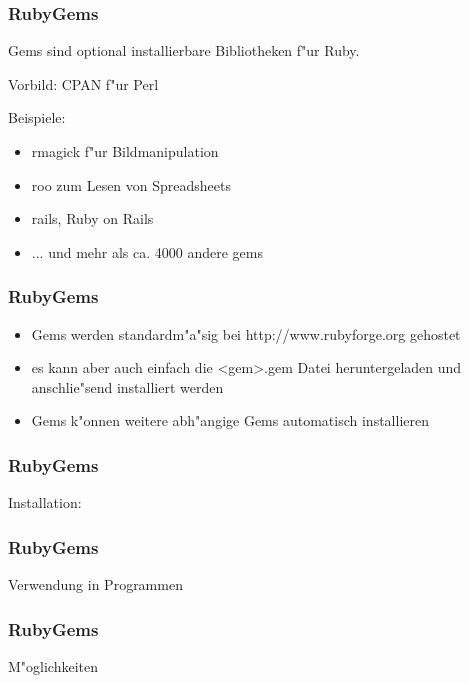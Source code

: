 \begin{frame}
  \frametitle{RubyGems}
  Gems sind optional installierbare Bibliotheken f"ur
  Ruby.
  
  Vorbild: CPAN f"ur Perl
 
  Beispiele:
  \begin{itemize}
    \item rmagick f"ur Bildmanipulation
    \item roo zum Lesen von Spreadsheets
    \item rails, Ruby on Rails
    \item ... und mehr als ca. 4000 andere gems
  \end{itemize}
\end{frame}

\begin{frame}
  \frametitle{RubyGems}
  \begin{itemize}
    \item Gems werden standardm"a"sig bei http://www.rubyforge.org gehostet
    \pause
    \item es kann aber auch einfach die <gem>.gem Datei heruntergeladen und anschlie"send installiert werden
    \pause
    \item Gems k"onnen weitere abh"angige Gems automatisch installieren
  \end{itemize} 
\end{frame}

\begin{frame}
  \frametitle{RubyGems}
  Installation:
  
\end{frame}

\begin{frame}
  \frametitle{RubyGems}
  Verwendung in Programmen
  
\end{frame}

\begin{frame}
  \frametitle{RubyGems}
  M"oglichkeiten
  
\end{frame}

